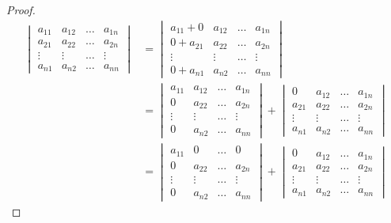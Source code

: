\documentclass{book} %
\begin{document}
					\begin{proof}
						\begin{align}
							\begin{vmatrix}
								a_{1 1} & a_{1 2} & \dots & a_{1 n} \\
								a_{2 1} & a_{2 2} & \dots & a_{2 n} \\
								\vdots & \vdots & \dots & \vdots \\
								a_{n 1} & a_{n 2} & \dots & a_{n n}
							\end{vmatrix}
							&= \begin{vmatrix}
								a_{1 1} + 0 & a_{1 2} & \dots & a_{1 n} \\
								0 + a_{2 1} & a_{2 2} & \dots & a_{2 n} \\
								\vdots & \vdots & \dots & \vdots \\
								0 + a_{n 1} & a_{n 2} & \dots & a_{n n}
							\end{vmatrix} \\
							&= \begin{vmatrix}
								a_{1 1} & a_{1 2} & \dots & a_{1 n} \\
								0  & a_{2 2} & \dots & a_{2 n} \\
								\vdots & \vdots & \dots & \vdots \\
								0 & a_{n 2} & \dots & a_{n n}
							\end{vmatrix} 
							+
							\begin{vmatrix}
								0 & a_{1 2} & \dots & a_{1 n} \\
								a_{2 1} & a_{2 2} & \dots & a_{2 n} \\
								\vdots & \vdots & \dots & \vdots \\
								a_{n 1} & a_{n 2} & \dots & a_{n n}
							\end{vmatrix} \\
							&= \begin{vmatrix}
								a_{1 1} & 0 & \dots & 0 \\
								0  & a_{2 2} & \dots & a_{2 n} \\
								\vdots & \vdots & \dots & \vdots \\
								0 & a_{n 2} & \dots & a_{n n}
							\end{vmatrix} 
							+
							\begin{vmatrix}
								0 & a_{1 2} & \dots & a_{1 n} \\
								a_{2 1} & a_{2 2} & \dots & a_{2 n} \\
								\vdots & \vdots & \dots & \vdots \\
								a_{n 1} & a_{n 2} & \dots & a_{n n}
							\end{vmatrix}
						\end{align}
					

\end{proof}
\end{document}
